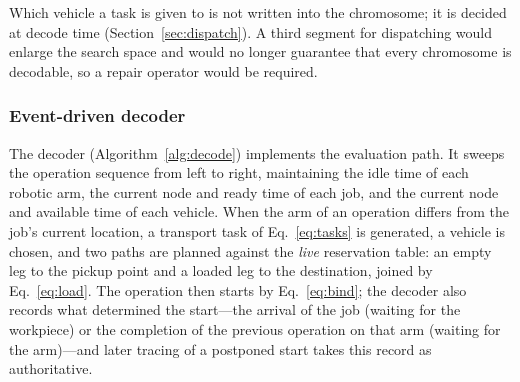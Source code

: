 \documentclass[manuscript,screen,review]{acmart}
\begin{document}
Which vehicle a task is given to is not written into the chromosome; it is decided at decode time (Section~\ref{sec:dispatch}).
A third segment for dispatching would enlarge the search space and would no longer guarantee that every chromosome is decodable, so a repair operator would be required.


\subsubsection{Event-driven decoder}
The decoder (Algorithm~\ref{alg:decode}) implements the evaluation path. It sweeps the operation sequence from left to right, maintaining the idle
time of each robotic arm, the current node and ready time of each job, and the current node and available time of each vehicle. When the
arm of an operation differs from the job's current location, a transport task of Eq.~\eqref{eq:tasks} is generated, a vehicle is chosen, and two paths are planned against the \emph{live}
reservation table: an empty leg to the pickup point and a loaded leg to the destination, joined by Eq.~\eqref{eq:load}.
The operation then starts by Eq.~\eqref{eq:bind}; the decoder also records what determined the start---the arrival of the job (waiting for the workpiece) or the completion of the previous operation on that arm (waiting for the arm)---and later tracing of a postponed start takes this record as authoritative.
\end{document}
